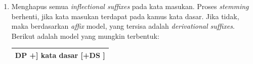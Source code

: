 \begin{enumerate}[leftmargin=*]
	\item Menghapus semua \textit{inflectional suffixes }pada kata 
	masukan. Proses \textit{stemming }berhenti, jika kata masukan\textit{ 
	}terdapat pada kamus kata dasar. Jika tidak, maka berdasarkan \textit{
	affix }model, yang tersisa adalah \textit{derivational suffixes}. Berikut adalah model yang mungkin terbentuk:
	\begin{table}[H]
		\hspace{12pt}
		\centering
		\small
		\begin{adjustbox}{width=1\linewidth}
			\begin{tabular}{|>{\centering\arraybackslash}p{\linewidth}|}
				\hline
				[ [ DP +][ DP +] DP +] kata dasar [+DS ]\\
				\hline
			\end{tabular}
		\end{adjustbox}
	

\end{table}
\end{enumerate}
